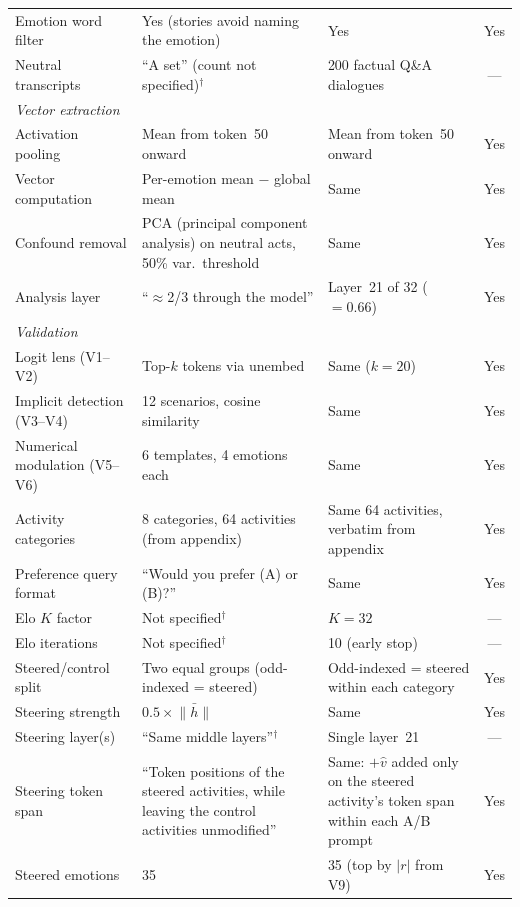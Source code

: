 \documentclass[11pt,a4paper]{article}
\begin{document}
\begin{table}[htbp]
\begin{tabular}{p{3.4cm}p{4.4cm}p{4.4cm}c}
    Emotion word filter
      & Yes (stories avoid naming the emotion) & Yes & Yes \\
    \rowcolor{unspecified}
    Neutral transcripts
      & ``A set'' (count not specified)$^\dagger$
      & 200 factual Q\&A dialogues & --- \\
    \midrule
    \multicolumn{4}{l}{\emph{Vector extraction}} \\
    Activation pooling
      & Mean from token~50 onward & Mean from token~50 onward & Yes \\
    Vector computation
      & Per-emotion mean $-$ global mean & Same & Yes \\
    Confound removal
      & PCA (principal component analysis) on neutral acts, 50\% var.\ threshold & Same & Yes \\
    Analysis layer
      & ``$\approx$2/3 through the model''
      & Layer~21 of 32 ($= 0.66$) & Yes \\
    \midrule
    \multicolumn{4}{l}{\emph{Validation}} \\
    Logit lens (V1--V2)
      & Top-$k$ tokens via unembed & Same ($k{=}20$) & Yes \\
    Implicit detection (V3--V4)
      & 12 scenarios, cosine similarity & Same & Yes \\
    Numerical modulation (V5--V6)
      & 6 templates, 4 emotions each & Same & Yes \\
    Activity categories
      & 8 categories, 64 activities (from appendix)
      & Same 64 activities, verbatim from appendix & Yes \\
    Preference query format
      & ``Would you prefer (A) or (B)?'' & Same & Yes \\
    \rowcolor{unspecified}
    Elo $K$ factor
      & Not specified$^\dagger$ & $K = 32$ & --- \\
    \rowcolor{unspecified}
    Elo iterations
      & Not specified$^\dagger$ & 10 (early stop) & --- \\
    Steered/control split
      & Two equal groups (odd-indexed = steered)
      & Odd-indexed = steered within each category & Yes \\
    Steering strength
      & $0.5 \times \bar{\|h\|}$ & Same & Yes \\
    \rowcolor{unspecified}
    Steering layer(s)
      & ``Same middle layers''$^\dagger$
      & Single layer~21 & --- \\
    Steering token span
      & ``Token positions of the steered activities, while leaving
        the control activities unmodified''
      & Same: $+\hat v$ added only on the steered activity's
        token span within each A/B prompt
      & Yes \\
    Steered emotions
      & 35 & 35 (top by $|r|$ from V9) & Yes \\
    \bottomrule
  \end{tabular}
\end{table}
\end{document}

